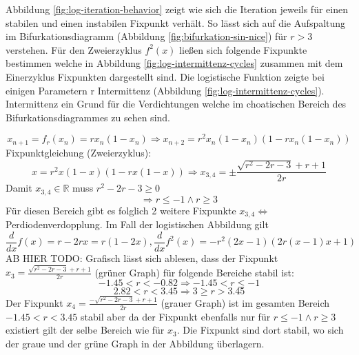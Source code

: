 \documentclass{scrartcl}
\begin{document}
Abbildung \ref{fig:log-iteration-behavior} zeigt wie sich die Iteration jeweils für einen stabilen und einen instabilen Fixpunkt verhält. So lässt sich auf die Aufspaltung im Bifurkationsdiagramm (Abbildung \ref{fig:bifurkation-sin-nice}) für $r>3$ verstehen.  
Für den Zweierzyklus $f^2(x)$ ließen sich folgende Fixpunkte bestimmen welche in Abbildung \ref{fig:log-intermittenz-cycles} zusammen mit dem Einerzyklus Fixpunkten dargestellt sind. 
Die logistische Funktion zeigte bei einigen Parametern r Intermittenz (Abbildung \ref{fig:log-intermittenz-cycles}). Intermittenz ein Grund für die Verdichtungen welche im choatischen Bereich des Bifurkationsdiagrammes zu sehen sind.

\begin{equation}x_{n+1}=f_r(x_n)=rx_n(1-x_n)
\Rightarrow x_{n+2}=r^2x_n(1-x_n)(1-rx_n(1-x_n))\end{equation}
\newline
Fixpunktgleichung (Zweierzyklus):
\begin{equation}x=r^2x(1-x)(1-rx(1-x))
\Rightarrow x_{3,4}=\pm\frac{\sqrt{r^2-2 r-3}+r+1}{2 r}\end{equation}
Damit $x_{3,4} \in \mathbb{R} $  muss $r^2-2 r-3 \geq 0$
\begin{equation}\Rightarrow r \leq -1 \land r \geq 3\end{equation}
Für diesen Bereich gibt es folglich 2 weitere Fixpunkte $x_{3,4} 
\Leftrightarrow$ Perdiodenverdopplung. 
Im Fall der logistischen Abbildung gilt
\begin{equation}\frac{d}{dx}f(x)=r-2rx=r(1-2x), 
\frac{d}{dx}f^2(x)=-r^2(2x-1)(2r(x-1)x+1)\end{equation}
AB HIER TODO: Grafisch lässt sich ablesen, dass der Fixpunkt $x_3=\frac{\sqrt{r^2-2 r-3}+r+1}{2 r}$ (grüner Graph) für folgende Bereiche stabil ist:
\begin{equation}-1.45<r<-0.82 \Rightarrow -1.45 < r \leq -1\end{equation}
\begin{equation}2.82<r<3.45 \Rightarrow 3 \geq r > 3.45\end{equation}
Der Fixpunkt $x_4=\frac{-\sqrt{r^2-2 r-3}+r+1}{2 r}$ (grauer Graph) ist im gesamten Bereich $-1.45<r<3.45$ stabil aber da der Fixpunkt ebenfalls nur für $r \leq -1 \land r \geq 3$ existiert gilt der selbe Bereich wie für $x_3$. Die Fixpunkt sind dort stabil, wo sich der graue und der grüne Graph in der Abbildung überlagern.
\end{document}
